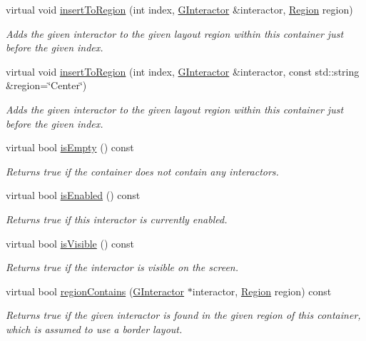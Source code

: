 \begin{DoxyCompactItemize}
virtual void \mbox{\hyperlink{classGContainer_a1be2b263cd8d28e61e136a19d8e935cc}{insert\+To\+Region}} (int index, \mbox{\hyperlink{classGInteractor}{G\+Interactor}} \&interactor, \mbox{\hyperlink{classGContainer_a81a01a86de31071a92e6cce0bab9bc4b}{Region}} region)
\begin{DoxyCompactList}\small\item\em Adds the given interactor to the given layout region within this container just before the given index. \end{DoxyCompactList}\item 
virtual void \mbox{\hyperlink{classGContainer_ad4d413f64a3e4fb948956e7249c10110}{insert\+To\+Region}} (int index, \mbox{\hyperlink{classGInteractor}{G\+Interactor}} \&interactor, const std\+::string \&region=\char`\"{}Center\char`\"{})
\begin{DoxyCompactList}\small\item\em Adds the given interactor to the given layout region within this container just before the given index. \end{DoxyCompactList}\item 
virtual bool \mbox{\hyperlink{classGContainer_acf82f9b2937375c7b1cf3dccb3df3312}{is\+Empty}} () const
\begin{DoxyCompactList}\small\item\em Returns true if the container does not contain any interactors. \end{DoxyCompactList}\item 
virtual bool \mbox{\hyperlink{classGInteractor_aacb819fb241851fd9fc045271baa4034}{is\+Enabled}} () const
\begin{DoxyCompactList}\small\item\em Returns true if this interactor is currently enabled. \end{DoxyCompactList}\item 
virtual bool \mbox{\hyperlink{classGInteractor_a9d8a6cfb13917785c143e74d40e4e2be}{is\+Visible}} () const
\begin{DoxyCompactList}\small\item\em Returns true if the interactor is visible on the screen. \end{DoxyCompactList}\item 
virtual bool \mbox{\hyperlink{classGContainer_a8909db9abf4dc80058f9e4a7b90ea2d0}{region\+Contains}} (\mbox{\hyperlink{classGInteractor}{G\+Interactor}} $\ast$interactor, \mbox{\hyperlink{classGContainer_a81a01a86de31071a92e6cce0bab9bc4b}{Region}} region) const
\begin{DoxyCompactList}\small\item\em Returns true if the given interactor is found in the given region of this container, which is assumed to use a border layout. \end{DoxyCompactList}\item 

\end{DoxyCompactItemize}
